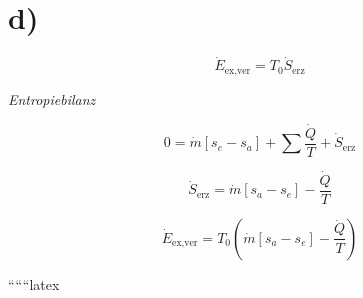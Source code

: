 

\section*{d)}
\[
\dot{E}_{\text{ex,ver}} = T_0 \dot{S}_{\text{erz}}
\]

\textit{Entropiebilanz}

\[
0 = \dot{m} [s_e - s_a] + \sum \frac{\dot{Q}}{T} + \dot{S}_{\text{erz}}
\]

\[
\dot{S}_{\text{erz}} = \dot{m} [s_a - s_e] - \frac{\dot{Q}}{T}
\]

\[
\dot{E}_{\text{ex,ver}} = T_0 \left( \dot{m} [s_a - s_e] - \frac{\dot{Q}}{T} \right)
\]

``````latex